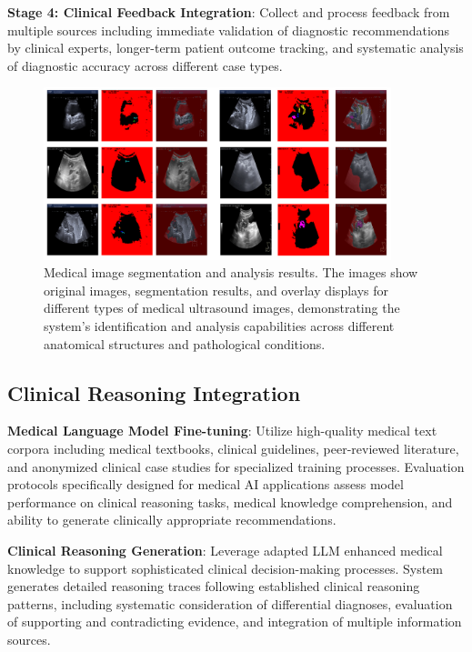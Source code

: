 \textbf{Stage 4: Clinical Feedback Integration}: Collect and process feedback from multiple sources including immediate validation of diagnostic recommendations by clinical experts, longer-term patient outcome tracking, and systematic analysis of diagnostic accuracy across different case types.

\begin{figure}[htbp]
\centering
\includegraphics[width=0.9\textwidth]{figures/Med/medsam_result.png}
\caption{Medical image segmentation and analysis results. The images show original images, segmentation results, and overlay displays for different types of medical ultrasound images, demonstrating the system's identification and analysis capabilities across different anatomical structures and pathological conditions.}
\label{fig:medsam_result}
\end{figure}

\subsection{Clinical Reasoning Integration}

\textbf{Medical Language Model Fine-tuning}: Utilize high-quality medical text corpora including medical textbooks, clinical guidelines, peer-reviewed literature, and anonymized clinical case studies for specialized training processes. Evaluation protocols specifically designed for medical AI applications assess model performance on clinical reasoning tasks, medical knowledge comprehension, and ability to generate clinically appropriate recommendations.

\textbf{Clinical Reasoning Generation}: Leverage adapted LLM enhanced medical knowledge to support sophisticated clinical decision-making processes. System generates detailed reasoning traces following established clinical reasoning patterns, including systematic consideration of differential diagnoses, evaluation of supporting and contradicting evidence, and integration of multiple information sources.

